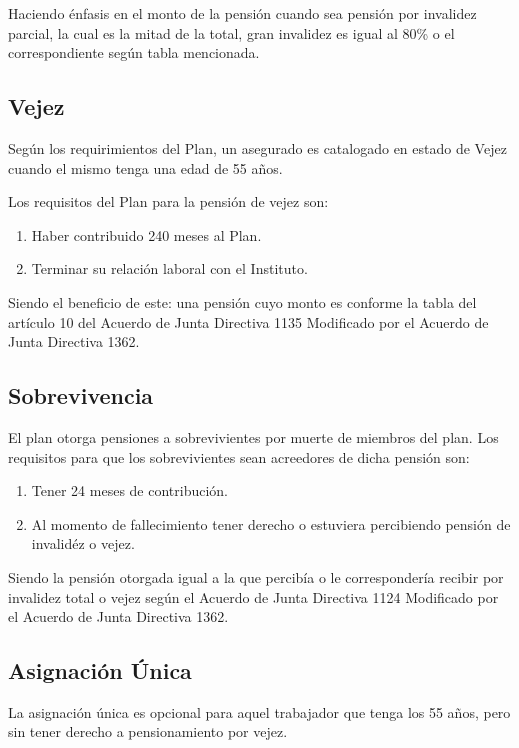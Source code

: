 \documentclass[12pt,letterpaper,titlepage]{article}
\begin{document}
Haciendo énfasis en el monto de la pensión cuando sea pensión por invalidez parcial, la cual es la mitad de la total, gran invalidez es igual al 80\% o el correspondiente según tabla mencionada.

\subsection{Vejez}

Según los requirimientos del Plan, un asegurado es catalogado en estado de Vejez cuando el mismo tenga una edad de 55 años.

Los requisitos del Plan para la pensión de vejez son:
\begin{enumerate}
	\item Haber contribuido 240 meses al Plan.
	\item Terminar su relación laboral con el Instituto.
\end{enumerate}

Siendo el beneficio de este: una pensión cuyo monto es conforme la tabla del artículo 10 del Acuerdo de Junta Directiva 1135 Modificado por el Acuerdo de Junta Directiva 1362.

\subsection{Sobrevivencia}

El plan otorga pensiones a sobrevivientes por muerte de miembros del plan. Los requisitos para que los sobrevivientes sean acreedores de dicha pensión son:

\begin{enumerate}
	\item Tener 24 meses de contribución.
	\item Al momento de fallecimiento tener derecho o estuviera percibiendo pensión de invalidéz o vejez.
\end{enumerate}

Siendo la pensión otorgada igual a la que percibía o le correspondería recibir por invalidez total o vejez según el Acuerdo de Junta Directiva 1124 Modificado por el Acuerdo de Junta Directiva 1362.

\subsection{Asignación Única}

La asignación única es opcional para aquel trabajador que tenga los 55 años, pero sin tener derecho a pensionamiento por vejez. 
\end{document}

